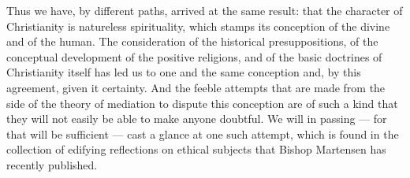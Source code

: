 \documentclass[12pt,a4paper,openany]{book}
\begin{document}
Thus we have, by different paths, arrived at the
same result: that the character of Christianity is natureless
spirituality, which stamps its conception of the divine
and of the human. The consideration of the
historical presuppositions, of the conceptual development of the positive religions,
and of the basic doctrines of Christianity itself
has led us to one and the same conception and, by
this agreement, given it certainty. And the feeble attempts
that are made from the side of the theory of mediation to dispute this
conception are of such a kind that they will not easily be able to make anyone
doubtful. We will in passing --- for that will be
sufficient --- cast a glance at one such attempt, which
is found in the collection of edifying reflections on ethical
subjects that Bishop Martensen has recently published.
\end{document}
